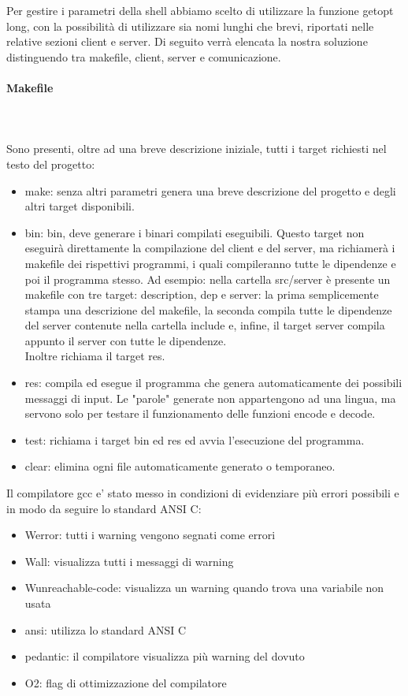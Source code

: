 \documentclass[12pt]{article}
\begin{document}
Per gestire i parametri della shell abbiamo scelto di utilizzare la funzione getopt long, con la possibilità di utilizzare sia nomi lunghi che brevi, riportati nelle relative sezioni client e server.
Di seguito verrà elencata la nostra soluzione distinguendo tra makefile, client, server e comunicazione.
\paragraph{Makefile} \mbox{}\\ \\
Sono presenti, oltre ad una breve descrizione iniziale, tutti i target richiesti nel testo del progetto: 
    	\begin{itemize}
    		\item make: senza altri parametri genera una breve descrizione del progetto e degli altri target disponibili.
   		\item bin: bin, deve generare i binari compilati eseguibili. Questo target non eseguirà direttamente la compilazione del client e del server, ma richiamerà i makefile dei rispettivi programmi, i quali compileranno tutte le dipendenze e poi il programma stesso. Ad esempio: nella cartella src/server è presente un makefile con tre target: description, dep e server: la prima semplicemente stampa una descrizione del makefile, la seconda compila tutte le dipendenze del server contenute nella cartella include e, infine, il target server compila appunto il server con tutte le dipendenze. \\
   		Inoltre richiama il target res.
    		\item res: compila ed esegue il programma che genera automaticamente dei possibili messaggi di input. Le "parole" generate non appartengono ad una lingua, ma servono solo per testare il funzionamento delle funzioni encode e decode.
    		\item test: richiama i target bin ed res ed avvia l'esecuzione del programma.
    		\item clear: elimina ogni file automaticamente generato o temporaneo.
    	\end{itemize}
Il compilatore gcc e' stato messo in condizioni di evidenziare più errori possibili e in modo da seguire lo standard ANSI C:
    \begin{itemize}
        \item Werror: tutti i warning vengono segnati come errori    
        \item Wall: visualizza tutti i messaggi di warning
        \item Wunreachable-code: visualizza un warning quando trova una variabile non usata
        \item ansi: utilizza lo standard ANSI C
        \item pedantic: il compilatore visualizza più warning del dovuto
        \item O2: flag di ottimizzazione del compilatore
    \end{itemize}
\end{document}

